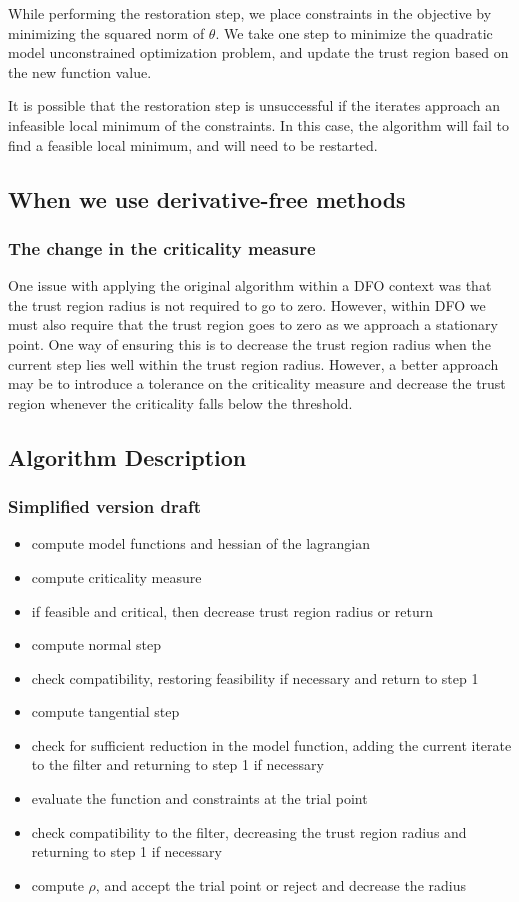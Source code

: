 \documentclass{article}
\begin{document}
While performing the restoration step, we place constraints in the objective by minimizing the squared norm of $\theta$.
We take one step to minimize the quadratic model unconstrained optimization problem, and update the trust region based on the new function value.

It is possible that the restoration step is unsuccessful if the iterates approach an infeasible local minimum of the constraints.
In this case, the algorithm will fail to find a feasible local minimum, and will need to be restarted.


\subsection{When we use derivative-free methods}

\subsubsection{The change in the criticality measure}
One issue with applying the original algorithm within a DFO context was that the trust region radius is not required to go to zero.
However, within DFO we must also require that the trust region goes to zero as we approach a stationary point. One way of ensuring this is to decrease the trust region radius when the current step lies well within the trust region radius. However, a better approach may be to introduce a tolerance on the criticality measure and decrease the trust region whenever the criticality falls below the threshold.


\subsection{Algorithm Description}

\subsubsection{Simplified version draft}

\begin{itemize}
\item compute model functions and hessian of the lagrangian
\item compute criticality measure
\item if feasible and critical, then decrease trust region radius or return
\item compute normal step
\item check compatibility, restoring feasibility if necessary and return to step 1
\item compute tangential step
\item check for sufficient reduction in the model function, adding the current iterate to the filter and returning to step 1 if necessary
\item evaluate the function and constraints at the trial point
\item check compatibility to the filter, decreasing the trust region radius and returning to step 1 if necessary
\item compute $\rho$, and accept the trial point or reject and decrease the radius
\end{itemize}
\end{document}
